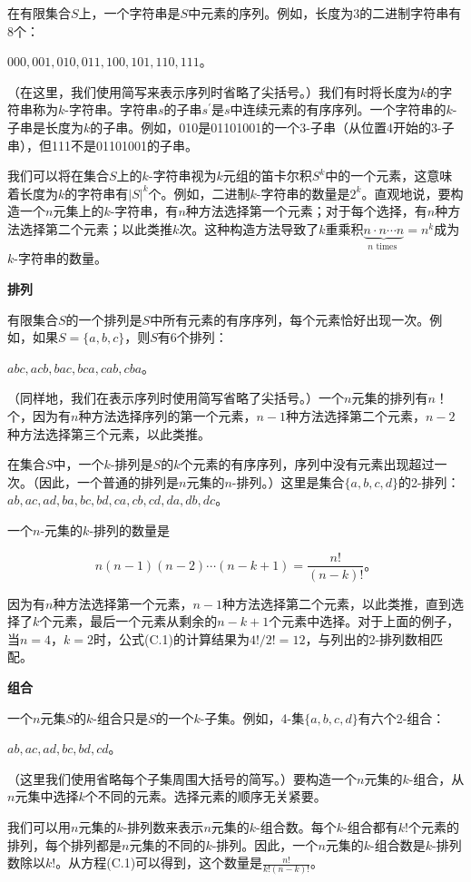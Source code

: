 \documentclass[lang=cn,newtx,10pt,scheme=chinese]{elegantbook}
\begin{document}
在有限集合$S$上，一个字符串是$S$中元素的序列。例如，长度为3的二进制字符串有8个：

$000,001,010,011,100,101,110,111$。

（在这里，我们使用简写来表示序列时省略了尖括号。）我们有时将长度为$k$的字符串称为$k$-字符串。字符串$s$的子串$s^{\prime}$是$s$中连续元素的有序序列。一个字符串的$k$-子串是长度为$k$的子串。例如，010是01101001的一个3-子串（从位置4开始的3-子串），但111不是01101001的子串。

我们可以将在集合$S$上的$k$-字符串视为$k$元组的笛卡尔积$S^k$中的一个元素，这意味着长度为$k$的字符串有$|S|^k$个。例如，二进制$k$-字符串的数量是$2^k$。直观地说，要构造一个$n$元集上的$k$-字符串，有$n$种方法选择第一个元素；对于每个选择，有$n$种方法选择第二个元素；以此类推$k$次。这种构造方法导致了$k$重乘积$\underbrace{n \cdot n \cdots n}_{n \text { times }}=n^k$成为$k$-字符串的数量。

\textbf{排列}

有限集合$S$的一个排列是$S$中所有元素的有序序列，每个元素恰好出现一次。例如，如果$S=\{a,b,c\}$，则$S$有6个排列：

$a b c, a c b, b a c, b c a, c a b, c b a$。

（同样地，我们在表示序列时使用简写省略了尖括号。）一个$n$元集的排列有$n$！个，因为有$n$种方法选择序列的第一个元素，$n-1$种方法选择第二个元素，$n-2$种方法选择第三个元素，以此类推。

在集合$S$中，一个$k$-排列是$S$的$k$个元素的有序序列，序列中没有元素出现超过一次。（因此，一个普通的排列是$n$元集的$n$-排列。）这里是集合$\{a,b,c,d\}$的2-排列：$a b, a c, a d, b a, b c, b d, c a, c b, c d, d a, d b, d c$。

一个$n$-元集的$k$-排列的数量是

$$
n(n-1)(n-2) \cdots(n-k+1)=\frac{n !}{(n-k) !} \text {。}
$$

因为有$n$种方法选择第一个元素，$n-1$种方法选择第二个元素，以此类推，直到选择了$k$个元素，最后一个元素从剩余的$n-k+1$个元素中选择。对于上面的例子，当$n=4$，$k=2$时，公式(C.1)的计算结果为$4 ! / 2 !=12$，与列出的2-排列数相匹配。

\textbf{组合}

一个$n$元集$S$的$k$-组合只是$S$的一个$k$-子集。例如，4-集$\{a,b,c,d\}$有六个2-组合：

$a b, a c, a d, b c, b d, c d$。

（这里我们使用省略每个子集周围大括号的简写。）要构造一个$n$元集的$k$-组合，从$n$元集中选择$k$个不同的元素。选择元素的顺序无关紧要。

我们可以用$n$元集的$k$-排列数来表示$n$元集的$k$-组合数。每个$k$-组合都有$k !$个元素的排列，每个排列都是$n$元集的不同的$k$-排列。因此，一个$n$元集的$k$-组合数是$k$-排列数除以$k !$。从方程(C.1)可以得到，这个数量是$\frac{n !}{k !(n-k) !}$。
\end{document}
